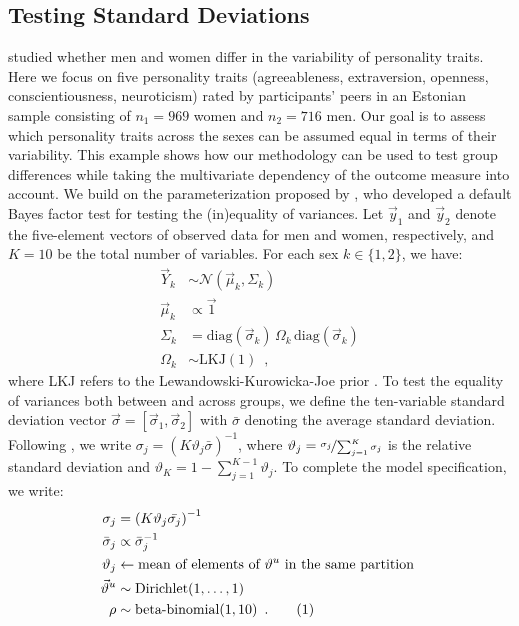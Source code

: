 \documentclass[11pt,a4paper]{article}
\theoremstyle{definition} %
\theoremstyle{case}
\newcommand{\numberthis}{\addtocounter{equation}{1}\tag{\theequation}}
\begin{document}
\subsection{Testing Standard Deviations}
\textcite{borkenau2013sex} studied whether men and women differ in the variability of personality traits. Here we focus on five personality traits (agreeableness, extraversion, openness, conscientiousness, neuroticism) rated by participants' peers in an Estonian sample consisting of $n_1 = 969$ women and $n_2 = 716$ men. Our goal is to assess which personality traits across the sexes can be assumed equal in terms of their variability. This example shows how our methodology can be used to test group differences while taking the multivariate dependency of the outcome measure into account. We build on the parameterization proposed by \textcite{dablander2020default}, who developed a default Bayes factor test for testing the (in)equality of variances. Let $\vec{y}_1$ and $\vec{y}_2$ denote the five-element vectors of observed data for men and women, respectively, and $K = 10$ be the total number of variables. For each sex $k \in \{1, 2\}$, we have:
\begin{align*}
    \vec{Y}_k         &\sim \mathcal{N}\left(\vec{\mu}_k, \Sigma_k \right)\\
    \vec{\mu}_k       &\propto \vec{1}  \\
    \Sigma_k          &= \text{diag}(\vec{\sigma}_k) \, \Omega_k \, \text{diag}(\vec{\sigma}_k) \\
    \Omega_k          &\sim \text{LKJ}(1) \enspace ,
\end{align*}
where LKJ refers to the Lewandowski-Kurowicka-Joe prior \parencite{lewandowski2009generating}. To test the equality of variances both between and across groups, we define the ten-variable standard deviation vector $\vec{\sigma} = [\vec{\sigma}_1, \vec{\sigma}_2]$ with $\bar{\sigma}$ denoting the average standard deviation. Following \textcite{dablander2020default}, we write $\sigma_j = \left(K\vartheta_j\bar{\sigma}\right)^{-1}$, where $\vartheta_j = \nicefrac{\sigma_j}{\sum_{j = 1}^K \sigma_j}$ is the relative standard deviation and $\vartheta_K = 1 - \sum_{j = 1}^{K - 1} \vartheta_j$. To complete the model specification, we write:
\begin{align*}
    \sigma_j     &= \left(K\vartheta_j\bar{\sigma_j}\right)^{-1} \\
    \bar{\sigma}_j &\propto \bar{\sigma}_j^{-1} \\
    \vartheta_j            &\leftarrow \text{mean of elements of } \vartheta^u \text{ in the same partition }\\
    \vec{\vartheta}^u     &\sim \text{Dirichlet}(1, \ldots, 1) \\
    \rho              &\sim \text{beta-binomial}(1, 10) \enspace . \numberthis
\end{align*}
\end{document}
